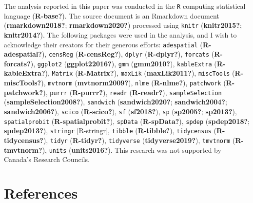 \documentclass[]{elsarticle} %
\begin{document}
The analysis reported in this paper was conducted in the \texttt{R}
computing statistical language (\textbf{R-base?}). The source document
is an Rmarkdown document (\textbf{rmarkdown2018?};
\textbf{rmarkdown2020?}) processed using \texttt{knitr}
(\textbf{knitr2015?}; \textbf{knitr2014?}). The following packages were
used in the analysis, and I wish to acknowledge their creators for their
generous efforts: \texttt{adespatial} (\textbf{R-adespatial?}),
\texttt{censReg} (\textbf{R-censReg?}), \texttt{dplyr}
(\textbf{R-dplyr?}), \texttt{forcats} (\textbf{R-forcats?}),
\texttt{ggplot2} (\textbf{ggplot22016?}), \texttt{gmm}
(\textbf{gmm2010?}), \texttt{kableExtra} (\textbf{R-kableExtra?}),
\texttt{Matrix} (\textbf{R-Matrix?}), \texttt{maxLik}
(\textbf{maxLik2011?}), \texttt{miscTools} (\textbf{R-miscTools?}),
\texttt{mvtnorm} (\textbf{mvtnorm2009?}), \texttt{nlme}
(\textbf{R-nlme?}), \texttt{patchwork} (\textbf{R-patchwork?}),
\texttt{purrr} (\textbf{R-purrr?}), \texttt{readr} (\textbf{R-readr?}),
\texttt{sampleSelection} (\textbf{sampleSelection2008?}),
\texttt{sandwich} (\textbf{sandwich2020?}; \textbf{sandwich2004?};
\textbf{sandwich2006?}), \texttt{scico} (\textbf{R-scico?}), \texttt{sf}
(\textbf{sf2018?}), \texttt{sp} (\textbf{sp2005?}; \textbf{sp2013?}),
\texttt{spatialprobit} (\textbf{R-spatialprobit?}), \texttt{spData}
(\textbf{R-spData?}), \texttt{spdep} (\textbf{spdep2018?};
\textbf{spdep2013?}), \texttt{stringr} {[}R-stringr{]}, \texttt{tibble}
(\textbf{R-tibble?}), \texttt{tidycensus} (\textbf{R-tidycensus?}),
\texttt{tidyr} (\textbf{R-tidyr?}), \texttt{tidyverse}
(\textbf{tidyverse2019?}), \texttt{tmvtnorm} (\textbf{R-tmvtnorm?}),
\texttt{units} (\textbf{units2016?}). This research was not supported by
Canada's Research Councils.

\hypertarget{references}{%
\section*{References}\label{references}}
\end{document}
